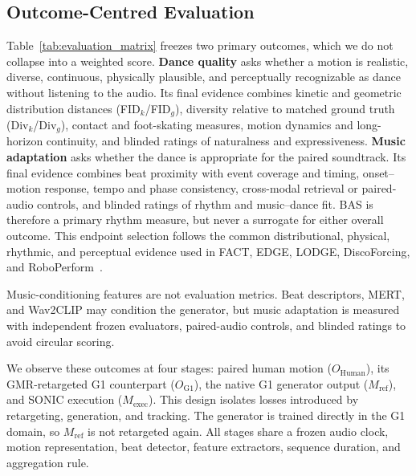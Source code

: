 \documentclass[conference]{IEEEtran}
\newif\ifshowpapertodos
\newcommand{\papertodo}[1]{%
\ifshowpapertodos
\par\smallskip\noindent
{\color{red!75!black}\textbf{TODO:} #1}
\smallskip\par
\fi}
\begin{document}
\papertodo{Train matched discrete-only, continuous-only, and direct motion-space generators under the selected compact-state contract. Add them only as one complete representation comparison. The matched Commit-Forcing and music studies follow their predeclared protocols above. Keep contact and project-specific diagnostic metrics out of paper tables.}

\subsection{Outcome-Centred Evaluation}
Table~\ref{tab:evaluation_matrix} freezes two primary outcomes, which we do not
collapse into a weighted score.
\textbf{Dance quality} asks whether a motion is realistic, diverse, continuous,
physically plausible, and perceptually recognizable as dance without listening to the
audio. Its final evidence combines kinetic and geometric distribution distances
(FID$_k$/FID$_g$), diversity relative to matched ground truth (Div$_k$/Div$_g$),
contact and foot-skating measures, motion dynamics and long-horizon continuity, and
blinded ratings of naturalness and expressiveness. \textbf{Music adaptation} asks
whether the dance is appropriate for the paired soundtrack. Its final evidence combines
beat proximity with event coverage and timing, onset--motion response, tempo and phase
consistency, cross-modal retrieval or paired-audio controls, and blinded ratings of
rhythm and music--dance fit. BAS is therefore a primary rhythm measure, but never a
surrogate for either overall outcome. This endpoint selection follows the common
distributional, physical, rhythmic, and perceptual evidence used in FACT, EDGE, LODGE,
DiscoForcing, and RoboPerform~\cite{li2021aist,tseng2023edge,li2024lodge,ji2026discoforcing,li2026roboperform}.

Music-conditioning features are not evaluation metrics. Beat descriptors, MERT, and
Wav2CLIP may condition the generator, but music adaptation is measured with independent
frozen evaluators, paired-audio controls, and blinded ratings to avoid circular scoring.

We observe these outcomes at four stages: paired human motion
($O_{\mathrm{Human}}$), its GMR-retargeted G1 counterpart ($O_{\mathrm{G1}}$), the
native G1 generator output ($M_{\mathrm{ref}}$), and SONIC execution
($M_{\mathrm{exec}}$). This design isolates losses introduced by retargeting,
generation, and tracking. The generator is trained directly in the G1 domain, so
$M_{\mathrm{ref}}$ is not retargeted again. All stages share a frozen audio clock,
motion representation, beat detector, feature extractors, sequence duration, and
aggregation rule.
\end{document}
